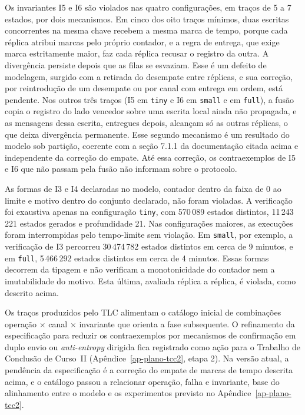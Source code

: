 Os invariantes I5 e I6 são violados nas quatro configurações, em traços de 5 a 7 estados, por dois mecanismos. Em cinco dos oito traços mínimos, duas escritas concorrentes na mesma chave recebem a mesma marca de tempo, porque cada réplica atribui marcas pelo próprio contador, e a regra de entrega, que exige marca estritamente maior, faz cada réplica recusar o registro da outra. A divergência persiste depois que as filas se esvaziam. Esse é um defeito de modelagem, surgido com a retirada do desempate entre réplicas, e sua correção, por reintrodução de um desempate ou por canal com entrega em ordem, está pendente. Nos outros três traços (I5 em \texttt{tiny} e I6 em \texttt{small} e em \texttt{full}), a fusão copia o registro do lado vencedor sobre uma escrita local ainda não propagada, e as mensagens dessa escrita, entregues depois, alcançam só as outras réplicas, o que deixa divergência permanente. Esse segundo mecanismo é um resultado do modelo sob partição, coerente com a seção 7.1.1 da documentação citada acima e independente da correção do empate. Até essa correção, os contraexemplos de I5 e I6 que não passam pela fusão não informam sobre o protocolo.

As formas de I3 e I4 declaradas no modelo, contador dentro da faixa de 0 ao limite e motivo dentro do conjunto declarado, não foram violadas. A verificação foi exaustiva apenas na configuração \texttt{tiny}, com 570\,089 estados distintos, 11\,243\,221 estados gerados e profundidade 21. Nas configurações maiores, as execuções foram interrompidas pelo tempo-limite sem violação. Em \texttt{small}, por exemplo, a verificação de I3 percorreu 30\,474\,782 estados distintos em cerca de 9 minutos, e em \texttt{full}, 5\,466\,292 estados distintos em cerca de 4 minutos. Essas formas decorrem da tipagem e não verificam a monotonicidade do contador nem a imutabilidade do motivo. Esta última, avaliada réplica a réplica, é violada, como descrito acima.

Os traços produzidos pelo TLC alimentam o catálogo inicial de combinações operação $\times$ canal $\times$ invariante que orienta a fase subsequente. O refinamento da especificação para reduzir os contraexemplos por mecanismos de confirmação em duplo envio ou \emph{anti-entropy} dirigida fica registrado como ação para o Trabalho de Conclusão de Curso~II (Apêndice~\ref{ap-plano-tcc2}, etapa 2). Na versão atual, a pendência da especificação é a correção do empate de marcas de tempo descrita acima, e o catálogo passou a relacionar operação, falha e invariante, base do alinhamento entre o modelo e os experimentos previsto no Apêndice~\ref{ap-plano-tcc2}.

